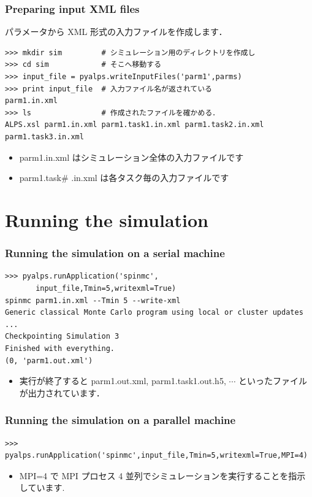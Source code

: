 \begin{frame}[t,fragile]
\frametitle{Preparing input XML files}
パラメータから XML 形式の入力ファイルを作成します．
\begin{lstlisting}
>>> mkdir sim         # シミュレーション用のディレクトリを作成し
>>> cd sim            # そこへ移動する
>>> input_file = pyalps.writeInputFiles('parm1',parms)
>>> print input_file  # 入力ファイル名が返されている
parm1.in.xml
>>> ls                # 作成されたファイルを確かめる．
ALPS.xsl parm1.in.xml parm1.task1.in.xml parm1.task2.in.xml parm1.task3.in.xml
\end{lstlisting}
\begin{itemize}
 \item parm1.in.xml はシミュレーション全体の入力ファイルです
 \item parm1.task\# .in.xml は各タスク毎の入力ファイルです
\end{itemize}

\end{frame}

\section{Running the simulation}
\begin{frame}[t,fragile]
\frametitle{Running the simulation on a serial machine}
\begin{lstlisting}
>>> pyalps.runApplication('spinmc',
       input_file,Tmin=5,writexml=True)
spinmc parm1.in.xml --Tmin 5 --write-xml
Generic classical Monte Carlo program using local or cluster updates
...
Checkpointing Simulation 3
Finished with everything.
(0, 'parm1.out.xml')
\end{lstlisting}
\begin{itemize}
\item 実行が終了すると parm1.out.xml, parm1.task1.out.h5, $\cdots$ といったファイルが出力されています．
\end{itemize}
 
\end{frame}

\begin{frame}[t,fragile]
\frametitle{Running the simulation on a parallel machine}
\begin{lstlisting}
>>> pyalps.runApplication('spinmc',input_file,Tmin=5,writexml=True,MPI=4)
\end{lstlisting}
\begin{itemize}
\item MPI=4 で MPI プロセス 4 並列でシミュレーションを実行することを指示しています.
\end{itemize}

\end{frame}

